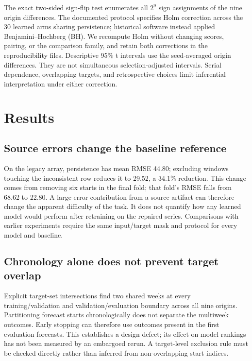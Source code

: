\documentclass[conference]{IEEEtran}
\begin{document}
The exact two-sided sign-flip test enumerates all $2^9$ sign assignments of the nine origin differences. %
The documented protocol specifies Holm correction across the 30 learned arms sharing persistence; historical software instead applied Benjamini--Hochberg (BH). %
We recompute Holm without changing scores, pairing, or the comparison family, and retain both corrections in the reproducibility files.
Descriptive 95\% t intervals use the seed-averaged origin differences. %
They are not simultaneous selection-adjusted intervals.
Serial dependence, overlapping targets, and retrospective choices limit inferential interpretation under either correction.

\section{Results}\label{sec:results}
\subsection{Source errors change the baseline reference}
On the legacy array, persistence has mean RMSE 44.80; excluding windows touching the inconsistent row reduces it to 29.52, a 34.1\% reduction. %
This change comes from removing six starts in the final fold; that fold's RMSE falls from 68.62 to 22.80. %
A large error contribution from a source artifact can therefore change the apparent difficulty of the task.
It does not quantify how any learned model would perform after retraining on the repaired series.
Comparisons with earlier experiments require the same input/target mask and protocol for every model and baseline.

\subsection{Chronology alone does not prevent target overlap}
Explicit target-set intersections find two shared weeks at every training/validation and validation/evaluation boundary across all nine origins. %
Partitioning forecast starts chronologically does not separate the multiweek outcomes.
Early stopping can therefore use outcomes present in the first evaluation forecasts.
This establishes a design defect; its effect on model rankings has not been measured by an embargoed rerun.
A target-level exclusion rule must be checked directly rather than inferred from non-overlapping start indices.


\end{document}
